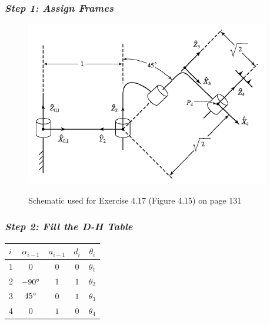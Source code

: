 \documentclass[10pt]{article}
\begin{document}
\subsubsection*{\textit{\textbf{Step 1: Assign Frames}}}
\begin{figure}[!h]
\centering
\includegraphics[]{Fig415}
\it{\caption{Schematic used for Exercise 4.17 (Figure 4.15) on page 131\cite{textbook}}}
\end{figure}
\subsubsection*{\textit{\textbf{Step 2: Fill the D-H Table}}}
\begin{center}
\begin{tabular}{ l | c c c c }
  $i$ & $\alpha_{i-1}$ & $a_{i-1}$ & $d_{i}$ & $\theta_{i}$ \\
  \hline
  1   & $0$            & $0$       & $0$     & $\theta_{1}$\\ 
  2   & $-90\degree$   & $1$       & $1$     & $\theta_{2}$\\
  3   & $45\degree$    & $0$       & $1$     & $\theta_{3}$\\
  4   & $0$            & $1$       & $0$     & $\theta_{4}$\\
\end{tabular}
\end{center}
\end{document}
